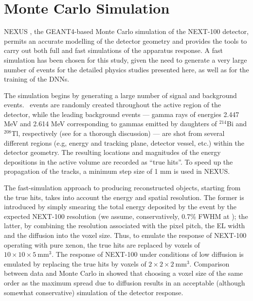 \documentclass[a4paper,11pt]{article}
\begin{document}
\section{Monte Carlo Simulation}\label{sec.MC}
NEXUS \cite{MartinAlbo_thesis}, the  GEANT4-based \cite{GEANT4} Monte Carlo simulation of the NEXT-100 detector, permits an accurate modelling of the detector geometry and provides the tools to carry out both full and fast simulations of the apparatus response. A fast simulation has been chosen for this study, given the need to generate a very large number of events for the detailed physics studies presented here, as well as for the training of the DNNs.

The simulation begins by generating a large number of signal and background events. \bbonu\ events are randomly created throughout the active region of the detector, while the leading background events --- gamma rays of energies 2.447 MeV and 2.614 MeV corresponding to gammas emitted by daughters of $^{214}$Bi and $^{208}$Tl, respectively (see \cite{Martin-Albo:2015rhw} for a thorough discussion) --- are shot from several different regions (e.g, energy and tracking plane, detector vessel, etc.) within the detector geometry.  The resulting locations and magnitudes of the energy depositions in the active volume are recorded as ``true hits''. To speed up the propagation of the tracks, a minimum step size of 1 mm is used in NEXUS.

The fast-simulation approach to producing reconstructed objects, starting from the true hits, takes into account the energy and spatial resolution. The former is introduced by simply smearing the total energy deposited by the event by the expected NEXT-100 resolution (we assume, conservatively, 0.7\% FWHM at \Qbb); the latter, by combining the resolution associated with the pixel pitch, the EL width and the diffusion into the voxel size. Thus, to emulate the response of NEXT-100 operating with pure xenon, the true hits are replaced by voxels of $10 \times 10 \times 5 \mathrm{~mm^3}$. The response of NEXT-100 under conditions of low diffusion is emulated by replacing the true hits by voxels of $2 \times 2 \times 2 \mathrm{~mm^3}$. Comparison between data and Monte Carlo in \cite{NEXT_topology} showed that choosing a voxel size of the same order as the maximum spread due to diffusion results in an acceptable (although somewhat conservative) simulation of the detector response. 
\end{document}
